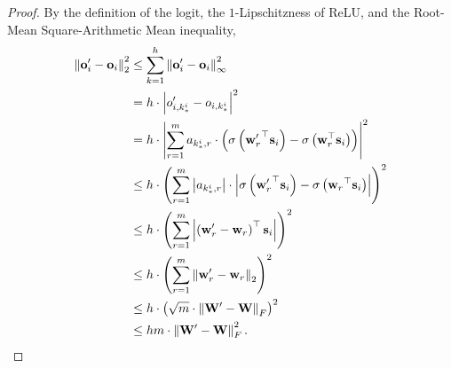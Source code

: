\documentclass[10pt]{article}
\def\rvo{{\mathbf{o}}}
\def\rvs{{\mathbf{s}}}
\def\rvw{{\mathbf{w}}}
\def\rvo{{\mathbf{o}}}
\def\rmW{{\mathbf{W}}}
\begin{document}
\begin{proof}
By the definition of the logit, the $1$-Lipschitzness of ReLU, and the Root-Mean Square-Arithmetic Mean inequality,
\begin{equation*}
\begin{split}
    \left\| \rvo_i^\prime - \rvo_i \right\|_2^2 &\le \sum\limits_{k = 1}^{h}{ \left\| \rvo_i^\prime - \rvo_i \right\|_\infty^2} \\
    &= h \cdot \left| o_{i,k_*^i}^\prime - o_{i,k_*^i} \right|^2 \\
    &= h \cdot \left| \sum\limits_{r=1}^{m}{ a_{k_*^i,r} \cdot \left( \sigma\left({\rvw_r^\prime}^\top \rvs_i \right) - \sigma\left(\rvw_r^\top \rvs_i \right) \right)} \right|^2 \\
    &\le h \cdot \left( \sum\limits_{r=1}^{m}{ \left| a_{k_*^i,r} \right| \cdot \left| \sigma\left({\rvw_r^\prime}^\top \rvs_i\right) - \sigma\left({\rvw_r}^\top \rvs_i\right) \right|  } \right)^2 \\
    &\le h \cdot \left( \sum\limits_{r=1}^{m}{ \left| \left({\rvw_r^\prime} - \rvw_r \right)^\top \rvs_i\right|  } \right)^2 \\
    &\le h \cdot \left( \sum\limits_{r=1}^{m}{ \left\| {\rvw_r^\prime} - \rvw_r \right\|_2  } \right)^2 \\
    &\le h \cdot \left( \sqrt{m} \cdot \left\| \rmW^\prime - \rmW \right\|_F \right)^2 \\
    &\le h m \cdot \left\| \rmW^\prime - \rmW \right\|_F^2. \qedhere
\end{split}
\end{equation*}
\end{proof}
\end{document}
